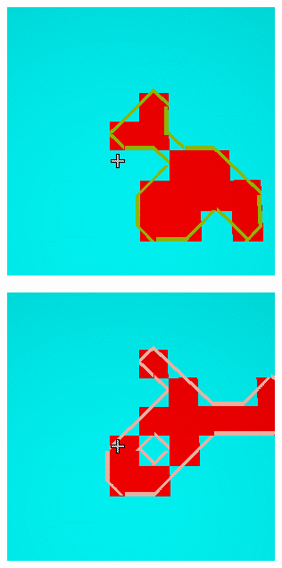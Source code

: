 \begin{figure}[htb]
 \centering
  \begin{subfigure}{.24\textwidth}
    \centering
    \includegraphics[width=.9\linewidth]{images/maps1}
  \end{subfigure}%
  \begin{subfigure}{.24\textwidth}
    \centering
    \includegraphics[width=.9\linewidth]{images/maps2}

\end{subfigure}
\end{figure}
